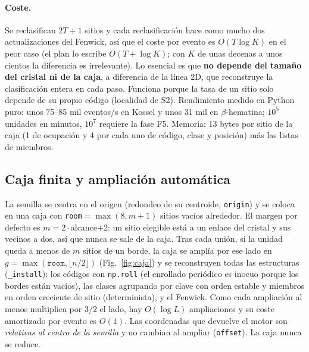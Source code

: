 \documentclass[11pt,a4paper]{article}
\newcommand{\code}[1]{\texttt{#1}}
\newcommand{\bh}{$\beta$-hematina}
\begin{document}
\paragraph{Coste.} Se reclasifican $2T+1$ sitios y cada reclasificación hace como mucho dos
actualizaciones del Fenwick, así que el coste por evento es $O(T\log K)$ en el peor caso (el plan lo
escribe $O(T+\log K)$; con $K$ de unas decenas a unos cientos la diferencia es irrelevante). Lo
esencial es que \textbf{no depende del tamaño del cristal ni de la caja}, a diferencia de la línea
2D, que reconstruye la clasificación entera en cada paso. Funciona porque la tasa de un sitio solo
depende de su propio código (localidad de S2). Rendimiento medido en Python puro: unos 75--85 mil
eventos/s en Kossel y unos 31 mil en \bh{}; $10^5$ unidades en minutos, $10^7$ requiere la fase F5.
Memoria: 13 bytes por sitio de la caja (1 de ocupación y 4 por cada uno de código, clase y posición)
más las listas de miembros.

\subsection{Caja finita y ampliación automática}
\label{sec:caja}

La semilla se centra en el origen (redondeo de su centroide, \code{origin}) y se coloca en una caja
con \code{room}$=\max(8,m+1)$ sitios vacíos alrededor. El margen por defecto es $m=2\cdot$alcance$+2$:
un sitio elegible está a un enlace del cristal y sus vecinos a dos, así que nunca se sale de la caja.
Tras cada unión, si la unidad queda a menos de $m$ sitios de un borde, la caja se amplía por ese lado en
$g=\max(\code{room},\lfloor n/2\rfloor)$ (Fig.~\ref{fig:caja}) y se reconstruyen todas las estructuras
(\code{\_install}): los códigos con \code{np.roll} (el enrollado periódico es inocuo porque los bordes
están vacíos), las clases agrupando por clave con orden estable y miembros en orden creciente de sitio
(determinista), y el Fenwick. Como cada ampliación al menos multiplica por $3/2$ el lado, hay $O(\log
L)$ ampliaciones y su coste amortizado por evento es $O(1)$. Las coordenadas que devuelve el motor son
\emph{relativas al centro de la semilla} y no cambian al ampliar (\code{offset}). La caja nunca se
reduce.
\end{document}
